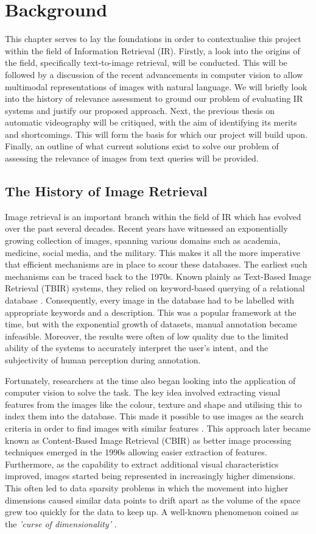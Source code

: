 \documentclass{l4proj}
\begin{document}
\chapter{Background}
This chapter serves to lay the foundations in order to contextualise this project within the field of Information Retrieval (IR). Firstly, a look into the origins of the field, specifically text-to-image retrieval, will be conducted. This will be followed by a discussion of the recent advancements in computer vision to allow multimodal representations of images with natural language. We will briefly look into the history of relevance assessment to ground our problem of evaluating IR systems and justify our proposed approach. Next, the previous thesis on automatic videography will be critiqued, with the aim of identifying its merits and shortcomings. This will form the basis for which our project will build upon. Finally, an outline of what current solutions exist to solve our problem of assessing the relevance of images from text queries will be provided.

\section{The History of Image Retrieval}
Image retrieval is an important branch within the field of IR which has evolved over the past several decades. Recent years have witnessed an exponentially growing collection of images, spanning various domains such as academia, medicine, social media, and the military. This makes it all the more imperative that efficient mechanisms are in place to scour these databases. The earliest such mechanisms can be traced back to the 1970s. Known plainly as Text-Based Image Retrieval (TBIR) systems, they relied on keyword-based querying of a relational database \citep{chang1979tbir}. Consequently, every image in the database had to be labelled with appropriate keywords and a description. This was a popular framework at the time, but with the exponential growth of datasets, manual annotation became infeasible. Moreover, the results were often of low quality due to the limited ability of the systems to accurately interpret the user's intent, and the subjectivity of human perception during annotation.

Fortunately, researchers at the time also began looking into the application of computer vision to solve the task. The key idea involved extracting visual features from the images like the colour, texture and shape and utilising this to index them into the database. This made it possible to use images as the search criteria in order to find images with similar features \citep{chang1981pictorial}. This approach later became known as Content-Based Image Retrieval (CBIR) as better image processing techniques emerged in the 1990s allowing easier extraction of features. Furthermore, as the capability to extract additional visual characteristics improved, images started being represented in increasingly higher dimensions. This often led to data sparsity problems in which the movement into higher dimensions caused similar data points to drift apart as the volume of the space grew too quickly for the data to keep up. A well-known phenomenon coined as the \emph{'curse of dimensionality'} \citep{bellman1957dp}.
\end{document}
